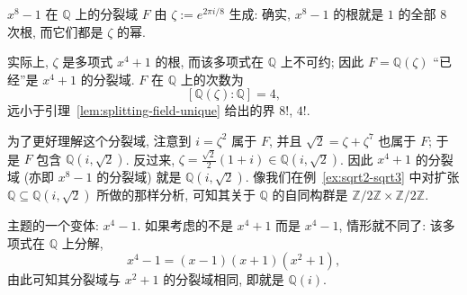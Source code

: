 \begin{example}\label{ex:x8-1-splitting}
$x^8-1$ 在 $\mathbb{Q}$ 上的分裂域 $F$ 由 $\zeta:=e^{2\pi i/8}$ 生成: 确实, $x^8-1$ 的根就是 $1$ 的全部 $8$ 次根, 而它们都是 $\zeta$ 的幂.
\begin{center}
\end{center}


实际上, $\zeta$ 是多项式 $x^4+1$ 的根, 而该多项式在 $\mathbb{Q}$ 上不可约; 因此 $F=\mathbb{Q}(\zeta)$ ``已经''是 $x^4+1$ 的分裂域. $F$ 在 $\mathbb{Q}$ 上的次数为
\[
[\mathbb{Q}(\zeta):\mathbb{Q}]=4,
\]
远小于引理~\ref{lem:splitting-field-unique} 给出的界 $8!$, $4!$.

为了更好理解这个分裂域, 注意到 $i=\zeta^2$ 属于 $F$, 并且 $\sqrt{2}=\zeta+\zeta^7$ 也属于 $F$; 于是 $F$ 包含 $\mathbb{Q}(i,\sqrt{2})$. 反过来, $\zeta=\frac{\sqrt{2}}{2}(1+i)\in\mathbb{Q}(i,\sqrt{2})$. 因此 $x^4+1$ 的分裂域 (亦即 $x^8-1$ 的分裂域) 就是 $\mathbb{Q}(i,\sqrt{2})$. 像我们在例~\ref{ex:sqrt2-sqrt3} 中对扩张 $\mathbb{Q}\subseteq\mathbb{Q}(i,\sqrt{2})$ 所做的那样分析, 可知其关于 $\mathbb{Q}$ 的自同构群是 $\mathbb{Z}/2\mathbb{Z}\times\mathbb{Z}/2\mathbb{Z}$.
\end{example}

\begin{example}\label{ex:x4-1-splitting}
主题的一个变体: $x^4-1$. 如果考虑的不是 $x^4+1$ 而是 $x^4-1$, 情形就不同了: 该多项式在 $\mathbb{Q}$ 上分解,
\[
x^4-1=(x-1)(x+1)(x^2+1),
\]
由此可知其分裂域与 $x^2+1$ 的分裂域相同, 即就是 $\mathbb{Q}(i)$.
\end{example}


